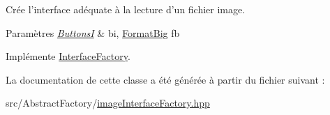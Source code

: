 Crée l'interface adéquate à la lecture d'un fichier image. 


\begin{DoxyParams}{Paramètres}
{\em \hyperlink{classButtonsI}{Buttons\+I}} & bi, \hyperlink{classFormatBig}{Format\+Big} fb \\
\hline
\end{DoxyParams}


Implémente \hyperlink{classInterfaceFactory}{Interface\+Factory}.



La documentation de cette classe a été générée à partir du fichier suivant \+:\begin{DoxyCompactItemize}
\item 
src/\+Abstract\+Factory/\hyperlink{imageInterfaceFactory_8hpp}{image\+Interface\+Factory.\+hpp}\end{DoxyCompactItemize}
